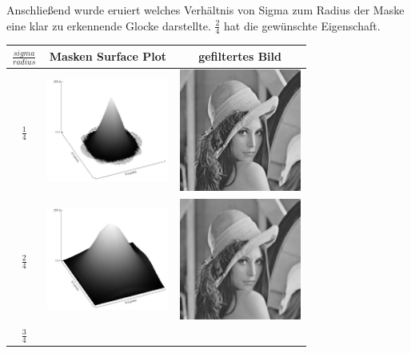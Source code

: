 \documentclass[12pt,german]{article}
\begin{document}
Anschließend wurde eruiert welches Verhältnis von Sigma zum Radius der Maske eine klar zu erkennende Glocke darstellte. $ \frac{2}{4} $ hat die gewünschte Eigenschaft. 
\begin{table}[H]
  \centering
  \begin{tabular}{| c | c | c |}
    \hline
    $ \frac{sigma}{radius} $ & Masken Surface Plot & gefiltertes Bild \\
    \hline
    $ \frac{1}{4} $ &
	\includegraphics[width=4cm]{../testData/Gauss/GaussBellR4S1.jpg} & 	\includegraphics[width=4cm]{../testData/Gauss/LenaR4S1.jpg} \\
	    \hline
    $ \frac{2}{4} $ &
	\includegraphics[width=4cm]{../testData/Gauss/GaussBellR4S2.jpg} & 	\includegraphics[width=4cm]{../testData/Gauss/LenaR4S2.jpg} \\
	    \hline
    $ \frac{3}{4} $ &

\end{tabular}
\end{table}
\end{document}
